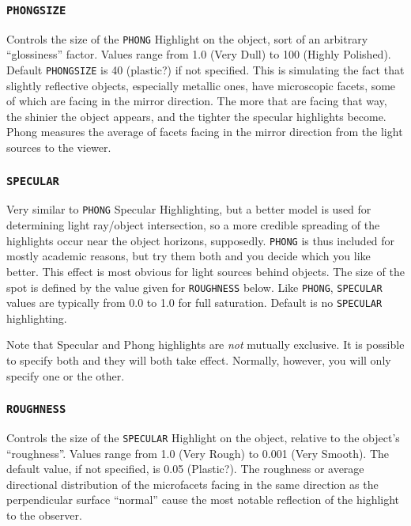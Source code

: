 \subsubsection{{\tt PHONGSIZE}}

Controls the size of the {\tt PHONG} Highlight on the object, sort of
an arbitrary ``glossiness'' factor.  Values range from 1.0 (Very Dull)
to 100 (Highly Polished).  Default {\tt PHONGSIZE} is 40 (plastic?) if
not specified.  This is simulating the fact that slightly reflective
objects, especially metallic ones, have microscopic facets, some of
which are facing in the mirror direction.  The more that are facing
that way, the shinier the object appears, and the tighter the specular
highlights become.  Phong measures the average of facets facing in the
mirror direction from the light sources to the viewer.

\subsubsection{{\tt SPECULAR}}

Very similar to {\tt PHONG} Specular Highlighting, but a better model
is used for determining light ray/object intersection, so a more
credible spreading of the highlights occur near the object horizons,
supposedly.  {\tt PHONG} is thus included for mostly academic reasons,
but try them both and you decide which you like better.  This effect
is most obvious for light sources behind objects.  The size of the
spot is defined by the value given for {\tt ROUGHNESS} below.  Like
{\tt PHONG}, {\tt SPECULAR} values are typically from 0.0 to 1.0 for
full saturation.  Default is no {\tt SPECULAR} highlighting.

Note that Specular and Phong highlights are {\em not} mutually
exclusive.  It is possible to specify both and they will both take
effect.  Normally, however, you will only specify one or the other.

\subsubsection{{\tt ROUGHNESS}}

Controls the size of the {\tt SPECULAR} Highlight on the object,
relative to the object's ``roughness''.  Values range from 1.0 (Very
Rough) to 0.001 (Very Smooth).  The default value, if not specified,
is 0.05 (Plastic?).  The roughness or average directional distribution
of the microfacets facing in the same direction as the perpendicular
surface ``normal'' cause the most notable reflection of the highlight
to the observer.


